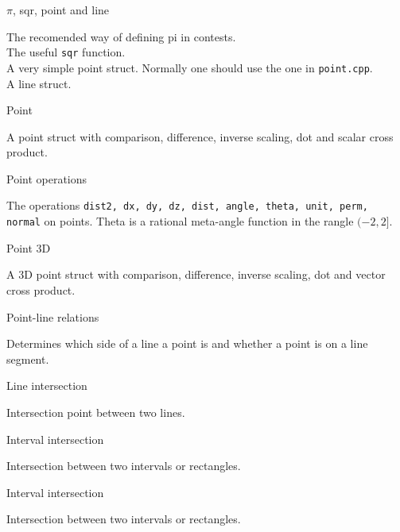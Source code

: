 \begin{algorithm}{$\pi$, sqr, point and line}

\desc
The recomended way of defining pi in contests. \\
The useful {\tt sqr} function. \\
A very simple point struct.
Normally one should use the one in {\tt point.cpp}. \\
A line struct.
\end{algorithm}

\begin{algorithm}{Point}

\desc
A point struct with comparison, difference, inverse scaling, dot and
scalar cross product.
\end{algorithm}

\begin{algorithm}{Point operations}

\desc
The operations {\tt dist2, dx, dy, dz, dist, angle, theta, unit, perm, normal}
on points. Theta is a rational meta-angle function in the rangle $(-2,2]$.
\end{algorithm}

\begin{algorithm}{Point 3D}

\desc
A 3D point struct with comparison, difference, inverse scaling, dot and
vector cross product.
\end{algorithm}

\begin{algorithm}{Point-line relations}

\desc
Determines which side of a line a point is and whether a point is on a line
segment.
\end{algorithm}

\begin{algorithm}{Line intersection}

\desc
Intersection point between two lines.
\end{algorithm}

\begin{algorithm}{Interval intersection}

\desc
Intersection between two intervals or rectangles.
\end{algorithm}

\begin{algorithm}{Interval intersection}

\desc
Intersection between two intervals or rectangles.
\end{algorithm}

